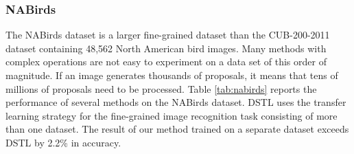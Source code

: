\documentclass[5p,twocolumn]{elsarticle}
\begin{document}
\begin{table}[h]
\centering
\caption{Comparison results on Oxford 102 Flowers dataset.}
\label{tab:flower}
\end{table}

\subsubsection{\textbf{NABirds}}
The NABirds dataset is a larger fine-grained dataset than the CUB-200-2011 dataset containing 48,562 North American bird images. Many methods with complex operations are not easy to experiment on a data set of this order of magnitude. If an image generates thousands of proposals, it means that tens of millions of proposals need to be processed. 
Table \ref{tab:nabirds} reports the performance of several methods on the NABirds dataset. 
DSTL \cite{Cui2018Large} uses the transfer learning strategy for the fine-grained image recognition task consisting of more than one dataset. The result of our method trained on a separate dataset exceeds DSTL by 2.2\% in accuracy. 
\end{document}
